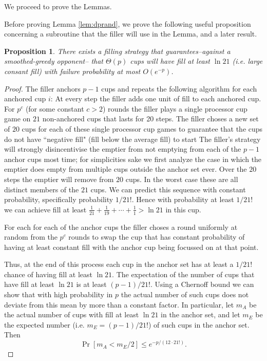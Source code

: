\documentclass{article}[11pt]
\newtheorem{proposition}{Proposition}
\begin{document}
We proceed to prove the Lemmas. 

Before proving Lemma \ref{lem:dprand}, we prove the following useful
proposition concerning a subroutine that the filler will use in the Lemma, and
a later result.
\begin{proposition}
  \label{prop:tail}
  There exists a filling strategy that guarantees--against a smoothed-greedy
  opponent-- that $\Theta(p)$ cups will have fill at least $\ln 21$ (i.e.
  large consant fill) with failure probability at most $O(e^{-p})$.
\end{proposition}
\begin{proof}
  The filler anchors $p-1$ cups and repeats the following algorithm for each
  anchored cup $i$: At every step the filler adds one unit of fill to each
  anchored cup. For $p^c$ (for some constant $c > 2$) rounds the filler plays a
  single processor cup game on $21$ non-anchored cups that lasts for 20 steps.
  The filler choses a new set of $20$ cups for each of these single processor
  cup games to guarantee that the cups do not have ``negative fill" (fill below
  the average fill) to start The filler's strategy will strongly disincentivise
  the emptier from not emptying from each of the $p-1$ anchor cups most time;
  for simplicities sake we first analyze the case in which the emptier does
  empty from multiple cups outside the anchor set ever. Over the $20$ steps the
  emptier will remove from $20$ cups. In the worst case these are all distinct
  members of the $21$ cups. We can predict this sequence with constant
  probability, specifically probability $1/21!$. Hence with probability at
  least $1/21!$ we can achieve fill at least $\frac{1}{21} + \frac{1}{19} +
  \cdots + \frac{1}{1} > \ln 21$ in this cup.

  For each for each of the anchor cups the filler choses a round uniformly at
  random from the $p^c$ rounds to swap the cup that has constant probability of
  having at least constant fill with the anchor cup being focussed on at that point.

  Thus, at the end of this process each cup in the anchor set has at
  least a $1/21!$ chance of having fill at least $\ln 21.$ The expectation of
  the number of cups that have fill at least $\ln 21$ is at least $(p-1)/21!$. 
  Using a Chernoff bound we can show that with high probability in $p$ the actual
  number of such cups does not deviate from this mean by more than a constant
  factor. In particular, let $m_A$ be the actual number of cups with fill at
  least $\ln 21$ in the anchor set, and let $m_E$ be the expected number (i.e.
  $m_E = (p-1)/21!$) of such cups in the anchor set. Then $$\Pr[m_A < m_E /2 ]
  \le e^{-p / (12\cdot 21!)}.$$


\end{proof}
\end{document}
